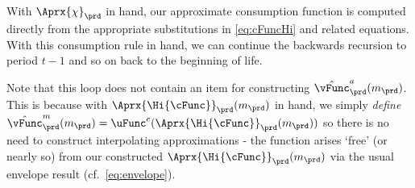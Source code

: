 \documentclass[\econtexRoot/SolvingMicroDSOPs]{subfiles}
\begin{document}
With $\Aprx{\chi}_{\prd}$ in hand, our approximate consumption function
is computed directly from the appropriate substitutions in \eqref{eq:cFuncHi}
and related equations.  With this consumption
rule in hand, we can continue the backwards recursion to period $t-1$
and so on back to the beginning of life.

Note that this loop does not contain an item for constructing $\hat{\vFunc}_{\prd}^{{a}}({m}_{\prd})$. This is because with $\Aprx{\Hi{\cFunc}}_{\prd}({m}_{\prd})$ in hand, we simply \textit{define} $\hat{\vFunc}^{{m}}_{\prd}({m}_{\prd}) = \uFunc^{{c}}(\Aprx{\Hi{\cFunc}}_{\prd}({m}_{\prd}))$ so there is no need to construct interpolating approximations - the function arises `free' (or nearly so) from our constructed $\Aprx{\Hi{\cFunc}}_{\prd}({m}_{\prd})$ via the usual envelope result (cf.\ \eqref{eq:envelope}).
\end{document}
